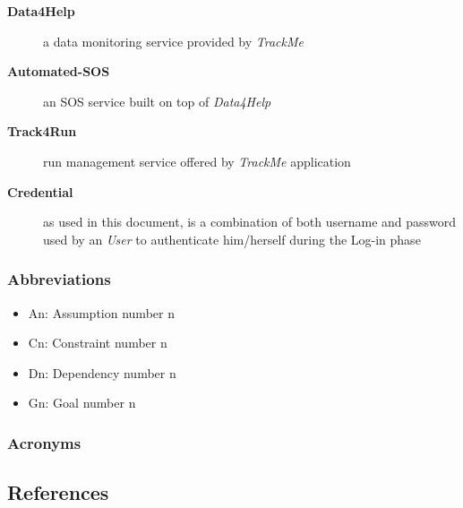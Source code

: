 \documentclass[a4paper]{article}
\begin{document}
\begin{description}
                    \item[\textbf{Data4Help}] a data monitoring service provided by \textit{TrackMe}
                    
                    \item[\textbf{Automated-SOS}] an SOS service built on top of \textit{Data4Help}
                    
                    \item[\textbf{Track4Run}] run management service offered by \textit{TrackMe} application
                    
                    \item[\textbf{Credential}] as used in this document, is a combination of both username and password used by an \textit{User} to authenticate him/herself during the Log-in phase
                \end{description}
                
            \subsubsection{Abbreviations}
            \begin{itemize}
                \item An: Assumption number n
                \item Cn: Constraint number n
                \item Dn: Dependency number n
                \item Gn: Goal number n
            \end{itemize}
            
            \subsubsection{Acronyms}
            \begin{acronym}
            \end{acronym}
            
    \subsection{References}
        \printbibliography[heading=none]
\newpage
\end{document}
